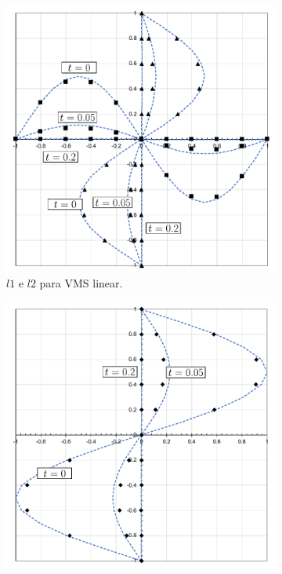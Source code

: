 \begin{figure}[h!]
    \centering
    \caption{Velocidades obtidas na a simulação de TGV em:}
    \begin{subfigure}{0.42\textwidth}
        \includegraphics[width=\linewidth]{Figuras/taylor-green/VMS-Lin.pdf}
        \caption{$l1$ e $l2$ para VMS linear.}
    \end{subfigure}
    \begin{subfigure}{0.42\textwidth}
        \includegraphics[width=\linewidth]{Figuras/taylor-green/VMS-Lin-uz.pdf}

\end{subfigure}
\end{figure}
